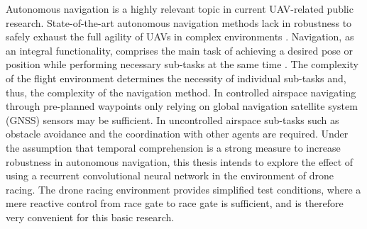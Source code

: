 Autonomous navigation is a highly relevant topic in current UAV-related public research.
State-of-the-art autonomous navigation methods 
lack in robustness to safely exhaust the full agility of UAVs in complex environments \cite{loquercio2018learning}.
Navigation, as an integral functionality,
comprises the main task of achieving a desired pose or position
while performing necessary sub-tasks at the same time \cite{loquercio2018learning}.
The complexity of the flight environment
determines the necessity of individual sub-tasks 
and, thus, the complexity of the navigation method.
In controlled airspace 
navigating through pre-planned waypoints only relying on global navigation satellite system (GNSS) 
sensors may be sufficient.
In uncontrolled airspace sub-tasks 
such as obstacle avoidance and the coordination with other agents are required.
Under the assumption that temporal comprehension is a strong measure
to increase robustness in autonomous navigation,
this thesis intends to explore the effect of using a recurrent convolutional neural network in the environment of drone racing.
The drone racing environment provides simplified test conditions, where a mere 
reactive control from race gate to race gate is sufficient,
and is therefore very convenient for this basic research.











